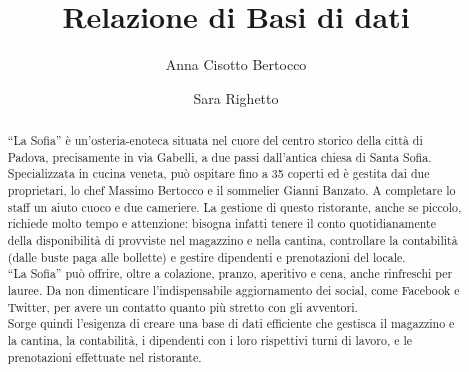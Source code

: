 


    \author{Anna Cisotto Bertocco \and Sara Righetto}
    \title{Relazione di Basi di dati}
    \maketitle

    \begin{abstract} 
        “La Sofia” è un’osteria-enoteca situata nel cuore del centro storico della città di Padova, precisamente in via Gabelli, a due passi dall’antica chiesa di Santa Sofia. \\
        Specializzata in cucina veneta, può ospitare fino a 35 coperti ed è gestita dai due proprietari, lo chef Massimo Bertocco e il sommelier Gianni Banzato. A completare lo staff un aiuto cuoco e due cameriere. \newline
        La gestione di questo ristorante, anche se piccolo, richiede molto tempo e attenzione: bisogna infatti tenere il conto quotidianamente della disponibilità di provviste nel magazzino e nella cantina, controllare la contabilità (dalle buste paga alle bollette) e gestire dipendenti e prenotazioni del locale. \\
        “La Sofia” può offrire, oltre a colazione, pranzo, aperitivo e cena, anche rinfreschi per lauree. Da non dimenticare l’indispensabile aggiornamento dei social, come Facebook e Twitter, per avere un contatto quanto più stretto con gli avventori. \\
        Sorge quindi l’esigenza di creare una base di dati efficiente che gestisca il magazzino e la cantina, la contabilità, i dipendenti con i loro rispettivi turni di lavoro, e le prenotazioni effettuate nel ristorante. 
    \end{abstract}
    \newpage


    
    \newpage
    
    \newpage
    
    \newpage

